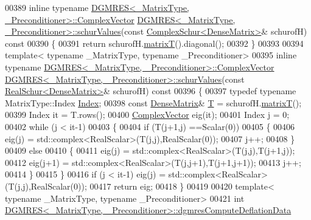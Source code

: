 \begin{DoxyCode}
00389 \textcolor{keyword}{inline} \textcolor{keyword}{typename} \hyperlink{group___core___module_class_eigen_1_1_matrix}{DGMRES<\_MatrixType, \_Preconditioner>::ComplexVector}
       \hyperlink{class_eigen_1_1_d_g_m_r_e_s}{DGMRES<\_MatrixType, \_Preconditioner>::schurValues}(\textcolor{keyword}{const} 
      \hyperlink{group___eigenvalues___module_class_eigen_1_1_complex_schur}{ComplexSchur<DenseMatrix>}& schurofH)\textcolor{keyword}{ const}
00390 \textcolor{keyword}{}\{
00391   \textcolor{keywordflow}{return} schurofH.\hyperlink{group___eigenvalues___module_add3ab5ed83f7f2f06b79fa910a2d5684}{matrixT}().diagonal();
00392 \}
00393 
00394 \textcolor{keyword}{template}< \textcolor{keyword}{typename} \_MatrixType, \textcolor{keyword}{typename} \_Preconditioner>
00395 \textcolor{keyword}{inline} \textcolor{keyword}{typename} \hyperlink{group___core___module_class_eigen_1_1_matrix}{DGMRES<\_MatrixType, \_Preconditioner>::ComplexVector}
       \hyperlink{class_eigen_1_1_d_g_m_r_e_s}{DGMRES<\_MatrixType, \_Preconditioner>::schurValues}(\textcolor{keyword}{const} 
      \hyperlink{group___eigenvalues___module_class_eigen_1_1_real_schur}{RealSchur<DenseMatrix>}& schurofH)\textcolor{keyword}{ const}
00396 \textcolor{keyword}{}\{
00397   \textcolor{keyword}{typedef} \textcolor{keyword}{typename} MatrixType::Index \hyperlink{namespace_eigen_a62e77e0933482dafde8fe197d9a2cfde}{Index};
00398   \textcolor{keyword}{const} \hyperlink{group___core___module}{DenseMatrix}& \hyperlink{group___sparse_core___module}{T} = schurofH.\hyperlink{group___eigenvalues___module_abb78996b43b8642a5f507415730445cb}{matrixT}();
00399   Index it = T.rows();
00400   \hyperlink{group___core___module_class_eigen_1_1_matrix}{ComplexVector} eig(it);
00401   Index j = 0;
00402   \textcolor{keywordflow}{while} (j < it-1)
00403   \{
00404     \textcolor{keywordflow}{if} (T(j+1,j) ==Scalar(0))
00405     \{
00406       eig(j) = std::complex<RealScalar>(T(j,j),RealScalar(0)); 
00407       j++; 
00408     \}
00409     \textcolor{keywordflow}{else}
00410     \{
00411       eig(j) = std::complex<RealScalar>(T(j,j),T(j+1,j)); 
00412       eig(j+1) = std::complex<RealScalar>(T(j,j+1),T(j+1,j+1));
00413       j++;
00414     \}
00415   \}
00416   \textcolor{keywordflow}{if} (j < it-1) eig(j) = std::complex<RealScalar>(T(j,j),RealScalar(0));
00417   \textcolor{keywordflow}{return} eig;
00418 \}
00419 
00420 \textcolor{keyword}{template}< \textcolor{keyword}{typename} \_MatrixType, \textcolor{keyword}{typename} \_Preconditioner>
00421 \textcolor{keywordtype}{int} \hyperlink{class_eigen_1_1_d_g_m_r_e_s}{DGMRES<\_MatrixType, \_Preconditioner>::dgmresComputeDeflationData}

\end{DoxyCode}
